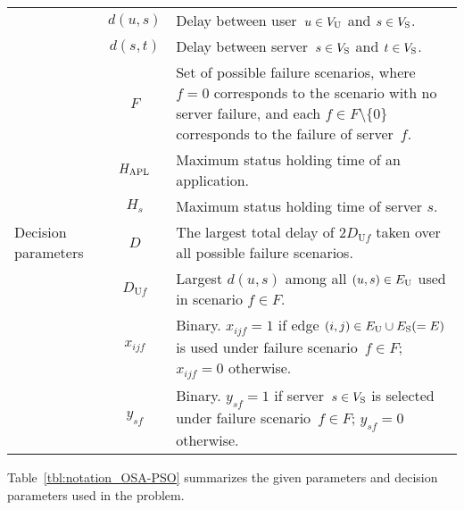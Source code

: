 \documentclass[10pt, letterpaper]{IEEEtran}
\begin{document}
\begin{CJK}{UTF8}{ipxm}
\begin{table}[tb]
\begin{tabular}{p{1.3cm}|cp{5.4cm}}
        & $d(u,s)$ & Delay between user~$u \in V_{\rm{U}}$ and $s \in V_{\rm{S}}$. \\
        & $d(s,t)$ & Delay between server~$s \in V_{\rm{S}}$ and $t \in V_{\rm{S}}$. \\ 
        & $F$ & Set of possible failure scenarios, where $f = 0$ corresponds to the scenario with no server failure, and each $f \in F \setminus \{0\}$ corresponds to the failure of server~$f$. \\
        & $H_{\rm APL}$ & Maximum status holding time of an application. \\
        & $H_s$ & Maximum status holding time of server $s$. \\ \hline
        Decision parameters & $D$ & The largest total delay of $2D_{\mathrm{U}f}$ taken over all possible failure scenarios. \\
        & $D_{\mathrm{U}f}$ & Largest $d(u,s)$ among all $(u,s) \in E_{\rm{U}}$ used in scenario $f \in F$. \\
        & $x_{ijf}$ & Binary. $x_{ijf} = 1$ if edge $(i,j) \in E_{\rm U} \cup E_{\rm S} (=E)$ is used under failure scenario~$f \in F$; $x_{ijf} = 0$ otherwise. \\
        & $y_{sf}$ & Binary. $y_{sf} = 1$ if server~$s \in V_{\rm{S}}$ is selected under failure scenario~$f \in F$; $y_{sf} = 0$ otherwise. \\ \hline
    \end{tabular}
\end{table}
Table~\ref{tbl:notation_OSA-PSO} summarizes the given parameters and decision parameters used in the problem.


\end{CJK}
\end{document}
